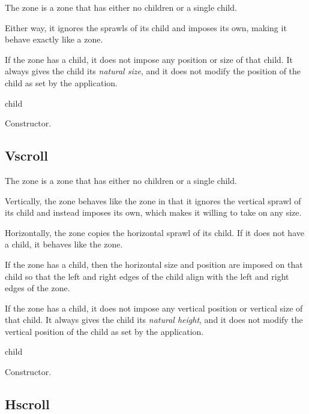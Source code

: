 The  zone is a zone that has either no children or a single
child.  

Either way, it ignores the sprawls of its child and imposes its own,
making it behave exactly like a  zone.  

If the  zone has a child, it does not impose any position
or size of that child.  It always gives the child its \emph{natural
  size}, and it does not modify the position of the child as set by
the application.



 {\optional child}

Constructor. 

\subsection{Vscroll}

The  zone is a zone that has either no children or a single
child.  

Vertically, the  zone behaves like the 
zone in that it ignores the vertical sprawl of its child and instead
imposes its own, which makes it willing to take on any size.  

Horizontally, the  zone copies the horizontal sprawl of
its child.  If it does not have a child, it behaves like the
 zone.  

If the  zone has a child, then the horizontal size and
position are imposed on that child so that the left and right edges of
the child align with the left and right edges of the 
zone.  

If the  zone has a child, it does not impose any vertical
position or vertical size of that child.  It always gives the child
its \emph{natural height}, and it does not modify the vertical
position of the child as set by the application.



 {\optional child}

Constructor. 

\subsection{Hscroll}

